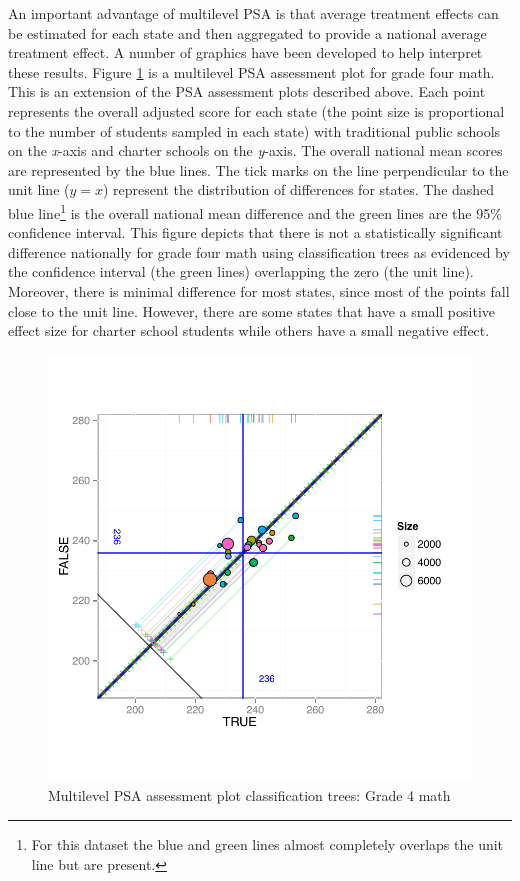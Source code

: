 \documentclass[letterpaper,12p,twoside]{article} %
\begin{document}
An important advantage of multilevel PSA is that average treatment effects can be estimated for each state and then aggregated to provide a national average treatment effect. A number of graphics have been developed to help interpret these results. Figure \ref{fig:g4math-mlpsa-ctree} is a multilevel PSA assessment plot for grade four math. This is an extension of the PSA assessment plots \cite{HelmreichPruzek2009} described above. Each point represents the overall adjusted score for each state (the point size is proportional to the number of students sampled in each state) with traditional public schools on the \textit{x}-axis and charter schools on the \textit{y}-axis. The overall national mean scores are represented by the blue lines. The tick marks on the line perpendicular to the unit line ($y = x$) represent the distribution of differences for states. The dashed blue line\footnote{For this dataset the blue and green lines almost completely overlaps the unit line but are present.} is the overall national mean difference and the green lines are the 95\% confidence interval. This figure depicts that there is not a statistically significant difference nationally for grade four math using classification trees as evidenced by the confidence interval (the green lines) overlapping the zero (the unit line). Moreover, there is minimal difference for most states, since most of the points fall close to the unit line. However, there are some states that have a small positive effect size for charter school students  while others have a small negative effect. 

\begin{figure}[t]
\begin{center}
\includegraphics[width=\textwidth]{../Figures2009/g4math-mlpsa-ctree-circ.pdf}
\caption{Multilevel PSA assessment plot classification trees: Grade 4 math}
\label{fig:g4math-mlpsa-ctree}
\end{center}
\end{figure}
\end{document}
